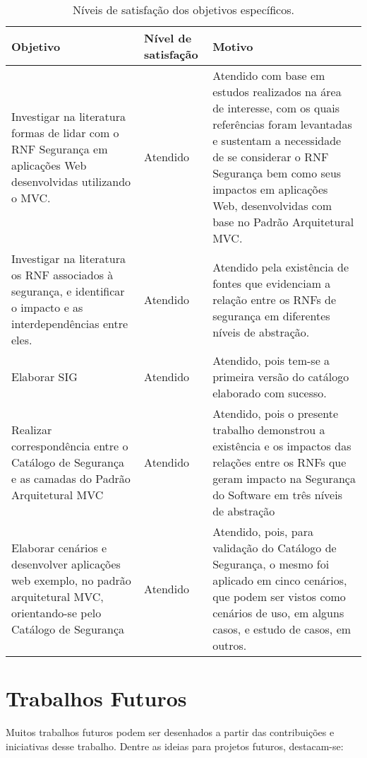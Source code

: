 \begin{table}[h!]
	\centering
	\caption{Níveis de satisfação dos objetivos específicos.}
	\label{resultadosObtidos}
	\tiny
	\begin{tabular}{@{}p{6cm}p{3cm}p{6cm}@{}}
		\toprule
		\textbf{Objetivo} & \textbf{Nível de satisfação} & \textbf{Motivo} \\ \midrule
		Investigar na literatura formas de lidar com o RNF Segurança  em aplicações Web desenvolvidas utilizando o MVC. &  Atendido & Atendido com base em estudos realizados na área de interesse, com os quais referências foram levantadas e sustentam a necessidade de se considerar o RNF Segurança bem como seus impactos em aplicações Web, desenvolvidas com base no Padrão Arquitetural MVC. \\
		\rowcolor[HTML]{C0C0C0} 
		Investigar na literatura os RNF associados à segurança, e identificar o impacto e as interdependências entre eles. & Atendido &  Atendido pela existência de fontes que evidenciam a relação entre os RNFs de segurança em diferentes níveis de abstração. \\
		Elaborar SIG & Atendido & Atendido, pois tem-se a primeira versão do catálogo elaborado com sucesso. \\
		\rowcolor[HTML]{C0C0C0} 
		Realizar correspondência entre o Catálogo de Segurança e as camadas do Padrão Arquitetural MVC & Atendido & Atendido, pois o presente trabalho demonstrou a existência e os impactos das relações entre os RNFs que geram impacto na Segurança do Software em três níveis de abstração \\
		
		Elaborar cenários e desenvolver aplicações web exemplo, no padrão arquitetural MVC, orientando-se pelo Catálogo de Segurança & Atendido & Atendido, pois, para validação do Catálogo de Segurança, o mesmo foi aplicado em cinco cenários, que podem ser vistos como cenários de uso, em alguns casos, e estudo de casos, em outros. \\
		 \bottomrule
	\end{tabular}
\end{table}

\section*{Trabalhos Futuros}

Muitos trabalhos futuros podem ser desenhados a partir das contribuições e iniciativas desse trabalho. Dentre as ideias para projetos futuros, destacam-se:

